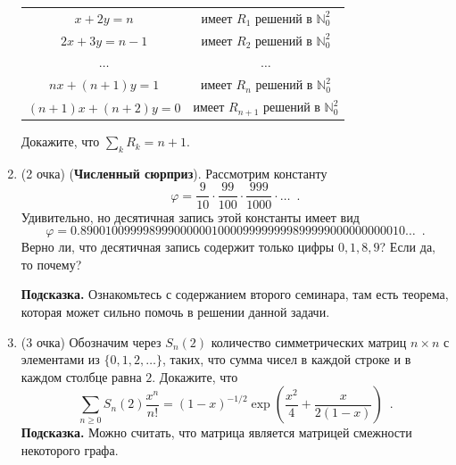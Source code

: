 \documentclass{article}
\theoremstyle{definition}
\begin{document}
\begin{enumerate}
\begin{tabular}{cc}
  $x + 2y = n$ & имеет $R_1$ решений в $\mathbb N_0^2$ \\
  $2x + 3y = n-1$ & имеет $R_2$ решений в $\mathbb N_0^2$ \\
  $\hdots$ & $\hdots$ \\
  $nx + (n+1)y = 1$ & имеет $R_n$ решений в $\mathbb N_0^2$ \\
  $(n+1)x + (n+2)y = 0$ & имеет $R_{n+1}$ решений в $\mathbb N_0^2$ \\
\end{tabular}

Докажите, что $\sum_{k} R_k = n+1$.
\item(2 очка) (\textbf{Численный сюрприз}). Рассмотрим константу
\[
	\varphi = \dfrac{9}{10} \cdot \dfrac{99}{100} \cdot
	\dfrac{999}{1000} \cdot \ldots
	\enspace .
\]
Удивительно, но десятичная запись этой константы имеет вид
\[
	\varphi = 0.8900100999989990000001000099999999899999000000000010 \ldots
	 \enspace .
\]
Верно ли, что десятичная запись содержит только цифры \( 0, 1, 8, 9 \)? Если 
да, то почему?

\textbf{Подсказка.} Ознакомьтесь с содержанием второго семинара, там есть теорема, которая может сильно помочь в решении данной задачи.
\item(3 очка) Обозначим через \( S_n(2) \) количество симметрических матриц \( 
n \times n \) 
с 
элементами из \( \{ 0,1,2,\ldots \} \), таких, что сумма чисел в каждой строке 
и в каждом столбце равна \( 2 \). Докажите, что
\[
	\sum_{n \geq 0} S_n(2) \dfrac{x^n}{n!} = (1-x)^{-1/2} \exp \left(
		\dfrac{x^2}{4} + \dfrac{x}{2(1-x)}
	\right) \enspace .
\]
\textbf{Подсказка.} Можно считать, что матрица является матрицей смежности некоторого 
графа.

\end{enumerate}

\footnotesize


    
\end{document}
